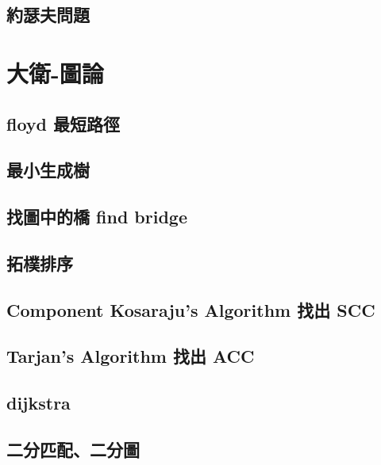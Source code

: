 \subsection{約瑟夫問題}
\raggedbottom
\hrulefill

\section{大衛-圖論}
\subsection{floyd 最短路徑}
\raggedbottom
\hrulefill
\subsection{最小生成樹}
\raggedbottom
\hrulefill
\subsection{找圖中的橋 find bridge}
\raggedbottom
\hrulefill
\subsection{拓樸排序}
\raggedbottom
\hrulefill
\subsection{Component Kosaraju's Algorithm 找出 SCC}
\raggedbottom
\hrulefill
\subsection{Tarjan's Algorithm 找出 ACC}
\raggedbottom
\hrulefill
\subsection{dijkstra}
\raggedbottom
\hrulefill
\subsection{二分匹配、二分圖}
\raggedbottom
\hrulefill

